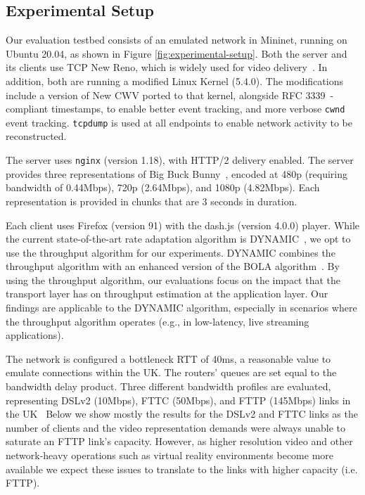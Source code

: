 \documentclass[10pt,sigconf,anonymous]{acmart}
\begin{document}
\subsection{Experimental Setup}
\label{sec:experimental-setup}



Our evaluation testbed consists of an emulated network in Mininet, running on Ubuntu 20.04, as shown in Figure \ref{fig:experimental-setup}. Both the server and its clients use TCP New Reno, which is widely used for video delivery~\cite{Mishra-2019-the-great-internet-tcp-congestion-control-census}. In addition, both are running a modified Linux Kernel (5.4.0). The modifications include a version of New CWV ported to that kernel, alongside RFC 3339~\cite{rfc3339-precise-timestamps}-compliant timestamps, to enable better event tracking, and more verbose \texttt{cwnd} event tracking. \texttt{tcpdump} is used at all endpoints to enable network activity to be reconstructed.

The server uses \texttt{nginx} (version 1.18), with HTTP/2 delivery enabled. The server provides three representations of Big Buck Bunny~\cite{online-bbb}, encoded at 480p (requiring bandwidth of 0.44Mbps), 720p (2.64Mbps), and 1080p (4.82Mbps). Each representation is provided in chunks that are 3 seconds in duration.

Each client uses Firefox (version 91) with the dash.js (version 4.0.0) player. While the current state-of-the-art rate adaptation algorithm is DYNAMIC~\cite{Spiteri-2019-from-theory-to-practice-sabre}, we opt to use the throughput algorithm for our experiments. DYNAMIC combines the throughput algorithm with an enhanced version of the BOLA algorithm~\cite{Spiteri-2016-BOLA}. By using the throughput algorithm, our evaluations focus on the impact that the transport layer has on throughput estimation at the application layer. Our findings are applicable to the DYNAMIC algorithm, especially in scenarios where the throughput algorithm operates (e.g., in low-latency, live streaming applications).

The network is configured a bottleneck RTT of 40ms, a reasonable value to emulate connections within the UK. The routers' queues are set equal to the bandwidth delay product. Three different bandwidth profiles are evaluated, representing DSLv2 (10Mbps), FTTC (50Mbps), and FTTP (145Mbps) links in the UK~\cite{online-ofcom-report} Below we show mostly the results for the DSLv2 and FTTC links as the number of clients and the video representation demands were always unable to saturate an FTTP link's capacity. However, as higher resolution video and other network-heavy operations such as virtual reality environments become more available we expect these issues to translate to the links with higher capacity (i.e. FTTP).
\end{document}
